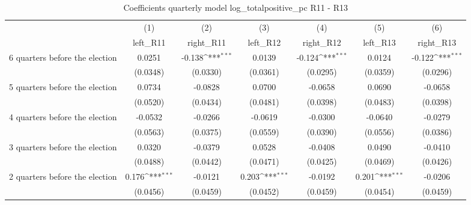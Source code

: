 \begin{table}[htbp]\centering
\def\sym#1{\ifmmode^{#1}\else\(^{#1}\)\fi}
\caption{Coefficients quarterly model log\_totalpositive\_pc R11 - R13}
\begin{tabular}{l*{6}{c}}
\hline\hline
                    &\multicolumn{1}{c}{(1)}&\multicolumn{1}{c}{(2)}&\multicolumn{1}{c}{(3)}&\multicolumn{1}{c}{(4)}&\multicolumn{1}{c}{(5)}&\multicolumn{1}{c}{(6)}\\
                    &\multicolumn{1}{c}{left\_R11}&\multicolumn{1}{c}{right\_R11}&\multicolumn{1}{c}{left\_R12}&\multicolumn{1}{c}{right\_R12}&\multicolumn{1}{c}{left\_R13}&\multicolumn{1}{c}{right\_R13}\\
\hline
 6 quarters before the election&      0.0251         &      -0.138\sym{***}&      0.0139         &      -0.124\sym{***}&      0.0124         &      -0.122\sym{***}\\
                    &    (0.0348)         &    (0.0330)         &    (0.0361)         &    (0.0295)         &    (0.0359)         &    (0.0296)         \\
[1em]
 5 quarters before the election&      0.0734         &     -0.0828         &      0.0700         &     -0.0658         &      0.0690         &     -0.0658         \\
                    &    (0.0520)         &    (0.0434)         &    (0.0481)         &    (0.0398)         &    (0.0483)         &    (0.0398)         \\
[1em]
 4 quarters before the election&     -0.0532         &     -0.0266         &     -0.0619         &     -0.0300         &     -0.0640         &     -0.0279         \\
                    &    (0.0563)         &    (0.0375)         &    (0.0559)         &    (0.0390)         &    (0.0556)         &    (0.0386)         \\
[1em]
 3 quarters before the election&      0.0320         &     -0.0379         &      0.0528         &     -0.0408         &      0.0490         &     -0.0410         \\
                    &    (0.0488)         &    (0.0442)         &    (0.0471)         &    (0.0425)         &    (0.0469)         &    (0.0426)         \\
[1em]
 2 quarters before the election&       0.176\sym{***}&     -0.0121         &       0.203\sym{***}&     -0.0192         &       0.201\sym{***}&     -0.0206         \\
                    &    (0.0456)         &    (0.0459)         &    (0.0452)         &    (0.0459)         &    (0.0454)         &    (0.0459)         \\

\end{tabular}
\end{table}
